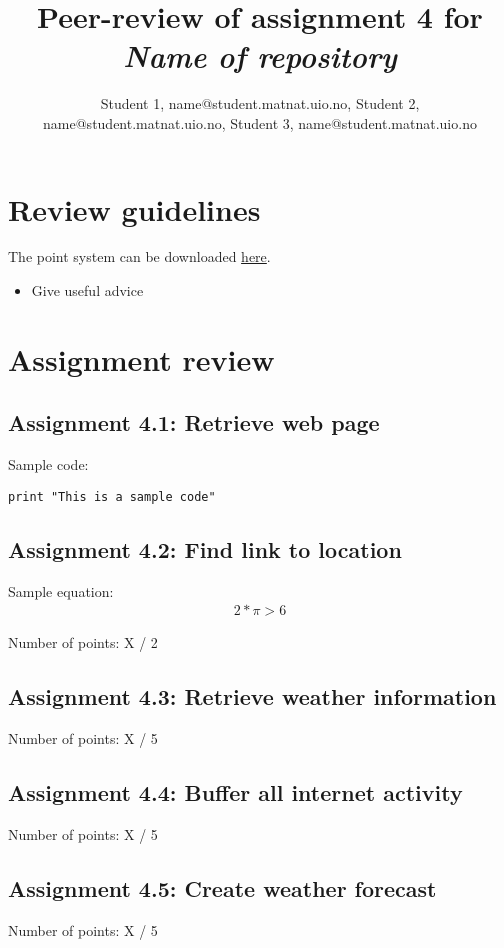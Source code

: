 \documentclass[a4paper]{article}
\title{Peer-review of assignment 4 for \textit{Name of repository}}
\author{Student 1, {name@student.matnat.uio.no},
        Student 2, {name@student.matnat.uio.no},
        Student 3, {name@student.matnat.uio.no}}
\begin{document}
\maketitle

\section{Review guidelines}

The point system can be downloaded \href{http://www.uio.no/studier/emner/matnat/ifi/INF3331/h15/assignments/review_rules.pdf}{here}.
\begin{itemize}
\item Give useful advice
\end{itemize}




\section{Assignment review}
\subsection*{Assignment 4.1: Retrieve web page}

Sample code:
\begin{verbatim}
print "This is a sample code"
\end{verbatim}

\subsection*{Assignment 4.2: Find link to location}

\noindent
Sample equation:
\begin{align}
2 * \pi > 6
\end{align}

Number of points: X / 2

\subsection*{Assignment 4.3: Retrieve weather information}

Number of points: X / 5
\subsection*{Assignment 4.4: Buffer all internet activity}
Number of points: X / 5

\subsection*{Assignment 4.5: Create weather forecast}
Number of points: X / 5
\end{document}
